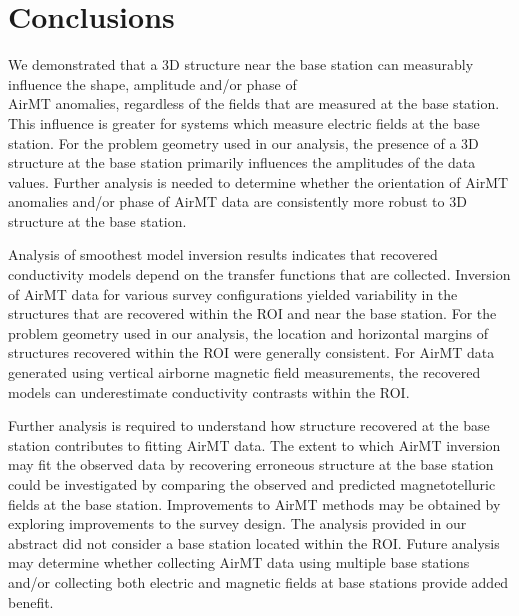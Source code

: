 \documentclass{segabs}
\begin{document}
\section{Conclusions}
\vspace{-5pt}
We demonstrated that a 3D structure near the base station can measurably influence the shape, amplitude and/or phase of\\ AirMT anomalies, regardless of the fields that are measured at the base station. This influence is greater for systems which measure electric fields at the base station. For the problem geometry used in our analysis, the presence of a 3D structure at the base station primarily influences the amplitudes of the data values. Further analysis is needed to determine whether the orientation of AirMT anomalies and/or phase of AirMT data are consistently more robust to 3D structure at the base station.

Analysis of smoothest model inversion results indicates that recovered conductivity models depend on the transfer functions that are collected. Inversion of AirMT data for various survey configurations yielded variability in the structures that are recovered within the ROI and near the base station. For the problem geometry used in our analysis, the location and horizontal margins of structures recovered within the ROI were generally consistent. For AirMT data generated using vertical airborne magnetic field measurements, the recovered models can underestimate conductivity contrasts within the ROI. 

Further analysis is required to understand how structure recovered at the base station contributes to fitting AirMT data. The extent to which AirMT inversion may fit the observed data by recovering erroneous structure at the base station could be investigated by comparing the observed and predicted magnetotelluric fields at the base station. Improvements to AirMT methods may be obtained by exploring improvements to the survey design. The analysis provided in our abstract did not consider a base station located within the ROI. Future analysis may determine whether collecting AirMT data using multiple base stations and/or collecting both electric and magnetic fields at base stations provide added benefit. 

\onecolumn

\end{document}
